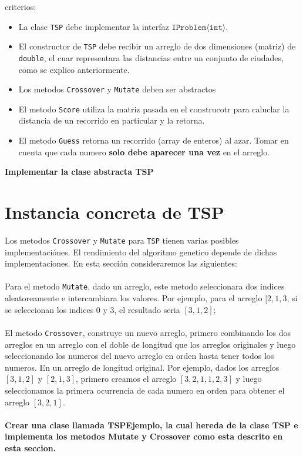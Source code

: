 \documentclass{article}
\begin{document}
criterios:
\begin{itemize}
        \item{La clase \texttt{TSP} debe implementar la interfaz $\mathtt{IProblem \langle int\rangle}$.}
        \item{El constructor de \texttt{TSP} debe recibir un arreglo de dos dimensiones (matriz) de \texttt{double}, el cuar representara
        las distancias entre un conjunto de ciudades, como se explico anteriormente.}
        \item{Los metodos \texttt{Crossover} y \texttt{Mutate} deben ser abstractos}
        \item{El metodo \texttt{Score} utiliza la matriz pasada en el construcotr para caluclar
        la distancia de un recorrido en particular y la retorna.}
        \item{El metodo \texttt{Guess} retorna un recorrido (array de enteros) al azar. Tomar
        en cuenta que cada numero {\bf solo debe aparecer una vez} en el arreglo.}
\end{itemize}
{\bf Implementar la clase abstracta TSP}

\section*{Instancia concreta de TSP}
Los metodos \texttt{Crossover} y \texttt{Mutate} para \texttt{TSP} tienen varias posibles
implementaci\'ones. El rendimiento del algoritmo genetico depende de dichas implementaciones.
En esta secci\'on consideraremos las siguientes:
\\\\
Para el metodo \texttt{Mutate}, dado un arreglo, este metodo seleccionara dos indices
aleatoreamente e intercambiara los valores. Por ejemplo, para el arreglo $[2,1,3$, si
se seleccionan los indices 0 y 3, el resultado seria $[3,1,2]$;
\\\\
El metodo \texttt{Crossover}, construye un nuevo arreglo, primero combinando los dos arreglos
en un arreglo con el doble de longitud que los arreglos originales y luego seleccionando
los numeros del nuevo arreglo en orden hasta tener todos los numeros. En un arreglo de longitud
original. Por ejemplo, dados los arreglos $[3,1,2]$ y $[2,1,3]$, primero creamos el arreglo
$[3,2,1,1,2,3]$ y luego seleccionamos la primera ocurrencia de cada numero en orden para
obtener el arreglo $[3,2,1]$.
\\\\
{\bf Crear una clase llamada TSPEjemplo, la cual hereda de la clase TSP e implementa los
metodos Mutate y Crossover como esta descrito en esta seccion.}
\end{document}
